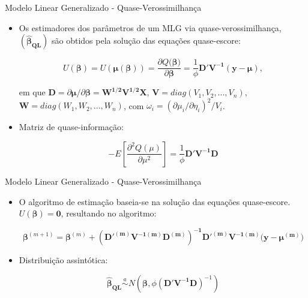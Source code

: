 \documentclass[10pt, aspectratio=169]{beamer}
\begin{document}
\begin{frame}{Modelo Linear Generalizado - Quase-Verossimilhança} 

\begin{itemize}


\item Os estimadores dos parâmetros de um MLG via quase-verossimilhança, $(\boldsymbol{\hat{\beta}_{QL}})$ são obtidos pela solução das equações quase-escore: 


$$U(\boldsymbol{\boldsymbol{\beta}})=U(\boldsymbol{\mu}({\boldsymbol{\beta}}))=\frac{\partial{Q(\boldsymbol{\beta)}}}{\partial{\boldsymbol{\beta}}}= \frac{1}{\phi}\boldsymbol{D'V^{-1}(y-\mu)},$$

em que $\boldsymbol{D}=\partial{\boldsymbol{\mu}}/\partial{\boldsymbol{\beta}}=\boldsymbol{W^{1/2}V^{1/2}X}$, $\boldsymbol{V}=diag(V_1,V_2,...,V_n)$, $\boldsymbol{W}=diag(W_1,W_2,...,W_n)$, com $\omega_i=(\partial{\mu_i}/\partial{\eta_i})^2 /V_i$.


\item Matriz de quase-informação:

$$-E\left [ \frac{\partial^2Q(\mu)}{\partial \mu^2} \right ] = \frac{1}{\phi}\boldsymbol{D'V^{-1}D}$$


\end{itemize}

\end{frame}






\begin{frame}{Modelo Linear Generalizado - Quase-Verossimilhança} 

\begin{itemize}


\item O algoritmo de estimação baseia-se na solução das equações quase-escore. $U(\boldsymbol{\boldsymbol{\beta}})=\boldsymbol{0}$, resultando no algoritmo:

\vspace{0.5cm}

$$\boldsymbol{\beta} ^{(m+1)} = \boldsymbol{\beta} ^{(m)} +
\boldsymbol{(D'^{(m)}V^{-1(m)}D^{(m)})^{-1}}
\boldsymbol{D'^{(m)}V^{-1(m)}(y-\mu^{(m)}})  
$$ 

\vspace{0.5cm}

\item Distribuição assintótica:

\vspace{0.3cm}

$$ \boldsymbol{\hat{\beta}_{QL}} \overset{a}{\sim} N(\boldsymbol{\beta}, \phi \boldsymbol{(D'V^{-1}D)}^{-1} )$$

\end{itemize}

\end{frame}
\end{document}
